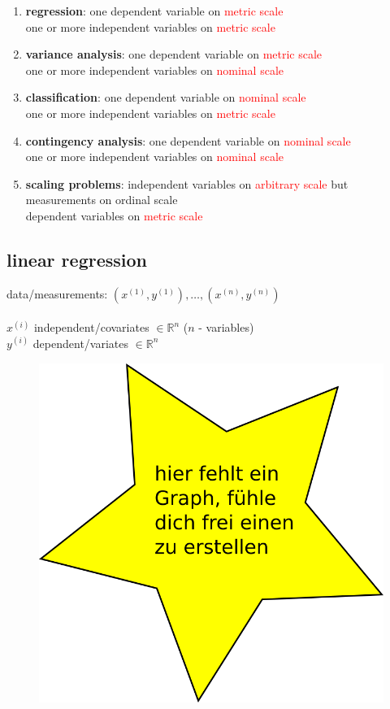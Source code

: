 	\begin{enumerate}[1.]
	 \item \textbf{regression}: one dependent variable on \textcolor{red}{metric scale}\\
	 one or more independent variables on \textcolor{red}{metric scale}
	 \item \textbf{variance analysis}: one dependent variable on \textcolor{red}{metric scale}\\
	 one or more independent variables on \textcolor{red}{nominal scale}
	 \item \textbf{classification}: one dependent variable on \textcolor{red}{nominal scale}\\
	 one or more independent variables on \textcolor{red}{metric scale}
	 \item \textbf{contingency analysis}: one dependent variable on \textcolor{red}{nominal scale}\\
	 one or more independent variables on \textcolor{red}{nominal scale}
	 \item \textbf{scaling problems}: independent variables on \textcolor{red}{arbitrary scale} but measurements on ordinal scale\\
	 dependent variables on \textcolor{red}{metric scale}
	\end{enumerate}

\subsection*{linear regression}

	data/measurements: $(x^{(1)}, y^{(1)}), \dots , (x^{(n)}, y^{(n)})$ \\\\
	$x^{(i)}$ independent/covariates $\in \mathbb{R}^n$ ($n$ - variables)\\
	$y^{(i)}$ dependent/variates $\in \mathbb{R}^n$\\
	
	\begin{figure}
		\centering
		\includegraphics[width=0.7\linewidth]{graphs/dummy}
	\end{figure}
	
